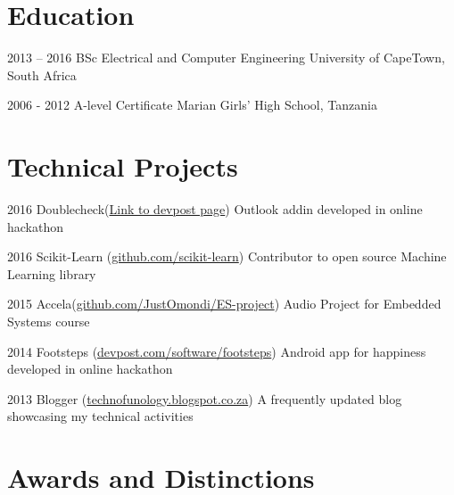 \documentclass[fontsize=9pt]{tccv}
\begin{document}
\section{Education}

\begin{yearlist}

\item{2013 -- 2016}
     {BSc Electrical and Computer Engineering}
     {University of CapeTown, South Africa}

\item{2006 - 2012}
     {A-level Certificate}
     {Marian Girls' High School, Tanzania}

\end{yearlist}

\section{Technical Projects}

\begin{yearlist}

\item{2016}
     {Doublecheck(\href{http://devpost.com/software/doublecheck}{Link to devpost page})}
     {Outlook addin developed in online hackathon}

\item{2016}
     {Scikit-Learn (\href{https://github.com/imaculate/scikit-learn}{github.com/scikit-learn})}
     {Contributor to open source Machine Learning library}

\item{2015}
     {Accela(\href{https://github.com/JustOmondi/ES-project}{github.com/JustOmondi/ES-project})}
     {Audio Project for Embedded Systems course}

\item{2014}
{Footsteps (\href{http://devpost.com/software/footsteps}{devpost.com/software/footsteps})}
{Android app for happiness developed in online hackathon}

\item{2013}
     {Blogger (\href{http://technofunology.blogspot.co.za/}{technofunology.blogspot.co.za})}
     {A frequently updated blog showcasing my technical activities}

\end{yearlist}

\section{Awards and Distinctions}
\end{document}

